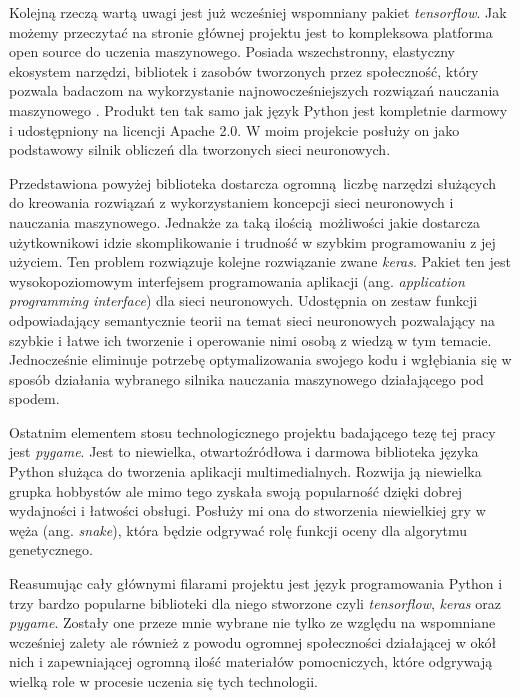 \documentclass[12pt, oneside, a4paper]{report}
\begin{document}
Kolejną rzeczą wartą uwagi jest już wcześniej wspomniany pakiet \textit{tensorflow}. Jak możemy przeczytać na stronie głównej projektu jest to kompleksowa platforma open source do uczenia maszynowego. Posiada wszechstronny, elastyczny ekosystem narzędzi, bibliotek i zasobów tworzonych przez społeczność, który pozwala badaczom na wykorzystanie najnowocześniejszych rozwiązań nauczania maszynowego \citep{tensorflow-wesite}. Produkt ten tak samo jak język Python jest kompletnie darmowy i udostępniony na licencji Apache 2.0. W moim projekcie posłuży on jako podstawowy silnik obliczeń dla tworzonych sieci neuronowych.

Przedstawiona powyżej biblioteka dostarcza ogromną liczbę narzędzi służących do kreowania rozwiązań z wykorzystaniem koncepcji sieci neuronowych i nauczania maszynowego. Jednakże za taką ilością możliwości jakie dostarcza użytkownikowi idzie skomplikowanie i trudność w szybkim programowaniu z jej użyciem. Ten problem rozwiązuje kolejne rozwiązanie zwane \textit{keras}. Pakiet ten jest wysokopoziomowym interfejsem programowania aplikacji (ang. \textit{application programming interface}) dla sieci neuronowych. Udostępnia on zestaw funkcji odpowiadający semantycznie teorii na temat sieci neuronowych pozwalający na szybkie i łatwe ich tworzenie i operowanie nimi osobą z wiedzą w tym temacie. Jednocześnie eliminuje potrzebę optymalizowania swojego kodu i wgłębiania się w sposób działania wybranego silnika nauczania maszynowego działającego pod spodem.

Ostatnim elementem stosu technologicznego projektu badającego tezę tej pracy jest \textit{pygame}. Jest to niewielka, otwartoźródłowa i darmowa biblioteka języka Python służąca do tworzenia aplikacji multimedialnych. Rozwija ją niewielka grupka hobbystów ale mimo tego zyskała swoją popularność dzięki dobrej wydajności i łatwości obsługi. Posłuży mi ona do stworzenia niewielkiej gry w węża (ang. \textit{snake}), która będzie odgrywać rolę funkcji oceny dla algorytmu genetycznego.

Reasumując cały głównymi filarami projektu jest język programowania Python i trzy bardzo popularne biblioteki dla niego stworzone czyli \textit{tensorflow}, \textit{keras} oraz \textit{pygame}. Zostały one przeze mnie wybrane nie tylko ze względu na wspomniane wcześniej zalety ale również z powodu ogromnej społeczności działającej w okół nich i zapewniającej ogromną ilość materiałów pomocniczych, które odgrywają wielką role w procesie uczenia się tych technologii.

\end{document}
